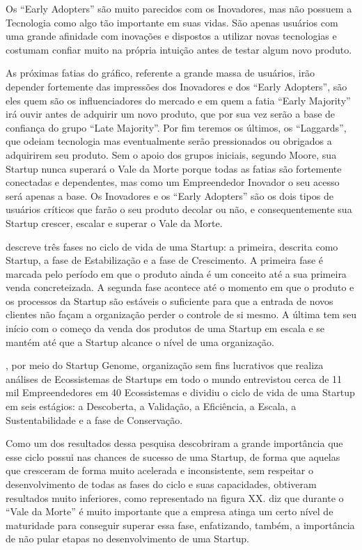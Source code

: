 Os ``Early Adopters'' são muito parecidos com os Inovadores, mas não possuem a Tecnologia como algo tão importante em suas vidas. São apenas usuários com uma grande afinidade com inovações e dispostos a utilizar novas tecnologias e costumam confiar muito na própria intuição antes de testar algum novo produto. 

As próximas fatias do gráfico, referente a grande massa de usuários, irão depender fortemente das impressões dos Inovadores e dos ``Early Adopters'', são eles quem são os influenciadores do mercado e em quem a fatia ``Early Majority'' irá ouvir antes de adquirir um novo produto, que por sua vez serão a base de confiança do grupo ``Late Majority''. Por fim teremos os últimos, os ``Laggards'', que odeiam tecnologia mas eventualmente serão pressionados ou obrigados a adquirirem seu produto. Sem o apoio dos grupos iniciais, segundo Moore, sua Startup nunca superará o Vale da Morte porque todas as fatias são fortemente conectadas e dependentes, mas como um Empreendedor Inovador o seu acesso será apenas a base. Os Inovadores e os ``Early Adopters'' são os dois tipos de usuários críticos que farão o seu produto decolar ou não, e consequentemente sua Startup crescer, escalar e superar o Vale da Morte.

 descreve três fases no ciclo de vida de uma Startup: a primeira, descrita como Startup, a fase de Estabilização e a fase de Crescimento.  A primeira fase é marcada pelo período em que o produto ainda é um conceito até a sua primeira venda concreteizada. A segunda fase acontece até o momento em que o produto e os processos da Startup são estáveis o suficiente para que a entrada de novos clientes não façam a organização perder o controle de si mesmo. A última tem seu início com o começo da venda dos produtos de uma Startup em escala e se mantém até que a Startup alcance o nível de uma organização.

, por meio do Startup Genome, organização sem fins lucrativos que realiza análises de Ecossistemas de Startups em todo o mundo entrevistou cerca de 11 mil Empreendedores em 40 Ecossistemas e dividiu o ciclo de vida de uma Startup em seis estágios: a Descoberta, a Validação, a Eficiência, a Escala, a Sustentabilidade e a fase de Conservação. 

Como um dos resultados dessa pesquisa descobriram a grande importância que esse ciclo possui nas chances de sucesso de uma Startup, de forma que aquelas que cresceram de forma muito acelerada e inconsistente, sem respeitar o desenvolvimento de todas as fases do ciclo e suas capacidades, obtiveram resultados muito inferiores, como representado na figura XX.  diz que durante o ``Vale da Morte'' é muito importante que a empresa atinga um certo nível de maturidade para conseguir superar essa fase, enfatizando, também, a importância de não pular etapas no desenvolvimento de uma Startup.

